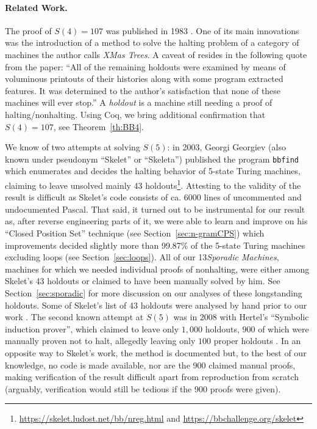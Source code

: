 \documentclass[a4paper,british]{article}
\theoremstyle{definition} %
\numberwithin{equation}{section}
\theoremstyle{definition} %
\newcommand{\ts}[1]{{\color{red}#1}}
\newcommand{\BBtheFourth}{107}
\newcommand{\numSporadic}{13\xspace}
\begin{document}
\paragraph{Related Work.} The proof of $S(4) = \BBtheFourth$ was published in 1983 \cite{Brady83}. One of its main innovations was the introduction of a method to solve the halting problem of a category of machines the author calls \textit{XMas Trees}. A caveat of \cite{Brady83} resides in the following quote from the paper: ``All of the remaining holdouts were examined by means of voluminous printouts of their histories along with some program extracted features. It was determined to the author's satisfaction that none of these machines will ever stop.'' A \textit{holdout} is a machine still needing a proof of halting/nonhalting. Using Coq, we bring additional confirmation that $S(4) = \BBtheFourth$, see Theorem~\ref{th:BB4}.

\newcommand{\SkeletHoldoutsSporadic}{\ts{XX}\xspace}

We know of two attempts at solving $S(5)$: in 2003, Georgi Georgiev (also known under pseudonym ``Skelet'' or ``Skeleta'') published the program \texttt{bbfind} \cite{Skelet_bbfind} which enumerates and decides the halting behavior of 5-state Turing machines, claiming to leave unsolved mainly 43 holdouts\footnote{\url{https://skelet.ludost.net/bb/nreg.html} and \url{https://bbchallenge.org/skelet}}. Attesting to the validity of the result is difficult as Skelet's code consists of ca. 6000 lines of uncommented and undocumented Pascal. That said, it turned out to be instrumental for our result as, after reverse engineering parts of it, we were able to learn and improve on his ``Closed Position Set'' technique (see Section~\ref{sec:n-gramCPS}) which improvements decided slightly more than 99.87\% of the 5-state Turing machines excluding loops (see Section~\ref{sec:loops}). All of our \numSporadic \textit{Sporadic Machines}, \ie machines for which we needed individual proofs of nonhalting, were either among Skelet's 43 holdouts or claimed to have been manually solved by him. See Section~\ref{sec:sporadic} for more discussion on our analyses of these longstanding holdouts. Some of Skelet's list of 43 holdouts were analysed by hand prior to our work \cite{DanBriggs}. The second known attempt at $S(5)$ was in 2008 with Hertel's ``Symbolic induction prover'', which claimed to leave only $1{,}000$ holdouts, $900$ of which were manually proven not to halt, allegedly leaving only $100$ proper holdouts \cite{Hertel}. In an opposite way to Skelet's work, the method is documented but, to the best of our knowledge, no code is made available, nor are the 900 claimed manual proofs, making verification of the result difficult apart from reproduction from scratch (arguably, verification would still be tedious if the 900 proofs were given).
\end{document}
